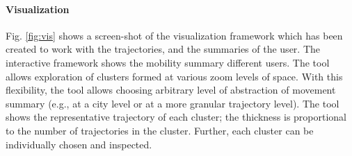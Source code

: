 \paragraph{Visualization}
\label{sec:vis}
Fig. \ref{fig:vis} shows a screen-shot of the visualization framework which has been created to work with the trajectories, and the summaries of the user. The interactive framework shows the mobility summary different users. The tool allows exploration of clusters formed at various zoom levels of space. With this flexibility, the tool allows choosing arbitrary level of abstraction of movement summary (e.g., at a city level or at a more granular trajectory level). 
The tool shows the representative trajectory of each cluster; the thickness is proportional to the number of trajectories in the cluster. Further, each cluster can be individually chosen and inspected. 